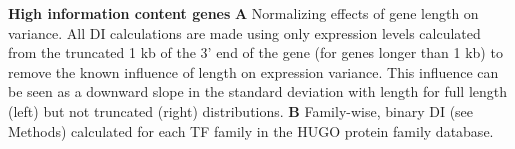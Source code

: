 \textbf{High information content genes}
\textbf{A} Normalizing effects of gene length on variance. All DI calculations are made using only expression levels calculated from the truncated 1 kb of the 3' end of the gene (for genes longer than 1 kb) to remove the known influence of length on expression variance. This influence can be seen as a downward slope in the standard deviation with length for full length (left) but not truncated (right) distributions.
\textbf{B} Family-wise, binary DI (see Methods) calculated for each TF family in the HUGO protein family database. 